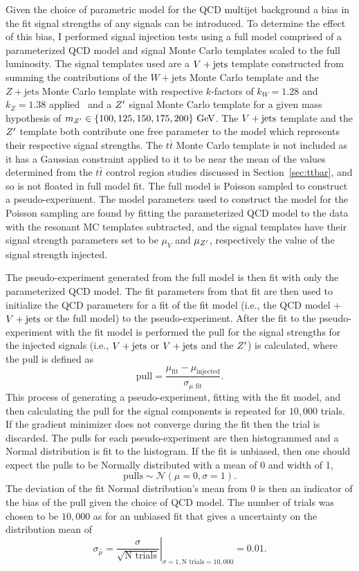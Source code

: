 Given the choice of parametric model for the QCD multijet background a bias in the fit signal strengths of any signals can be introduced.
To determine the effect of this bias, I performed signal injection tests using a full model comprised of a parameterized QCD model and signal Monte Carlo templates scaled to the full luminosity.
The signal templates used are a $V + \text{jets}$ template constructed from summing the contributions of the $W+\mathrm{jets}$ Monte Carlo template and the $Z+\mathrm{jets}$ Monte Carlo template with respective $k$-factors of $k_{W} = 1.28$ and $k_{Z} = 1.38$ applied~\cite{EXOT-2017-01} and a $Z'$ signal Monte Carlo template for a given mass hypothesis of $m_{Z'}\in\{100, 125, 150, 175, 200\}~\mathrm{GeV}$.
The $V + \text{jets}$ template and the $Z'$ template both contribute one free parameter to the model which represents their respective signal strengths.
The $t\bar{t}$ Monte Carlo template is not included as it has a Gaussian constraint applied to it to be near the mean of the values determined from the $t\bar{t}$ control region studies discussed in Section~\ref{sec:ttbar}, and so is not floated in full model fit.
The full model is Poisson sampled to construct a pseudo-experiment.
The model parameters used to construct the model for the Poisson sampling are found by fitting the parameterized QCD model to the data with the resonant MC templates subtracted, and the signal templates have their signal strength parameters set to be $\mu_{V}$ and $\mu_{Z'}$, respectively the value of the signal strength injected.

The pseudo-experiment generated from the full model is then fit with only the parameterized QCD model.
The fit parameters from that fit are then used to initialize the QCD parameters for a fit of the fit model (i.e., the QCD model + $V + \text{jets}$ or the full model) to the pseudo-experiment.
After the fit to the pseudo-experiment with the fit model is performed the pull for the signal strengths for the injected signals (i.e., $V + \text{jets}$ or $V + \text{jets}$ and the $Z'$) is calculated, where the pull is defined as
\begin{equation}
 \mathrm{pull} = \frac{\mu_{\mathrm{fit}} - \mu_{\mathrm{injected}}}{\sigma_{\mu\textrm{ fit}}}.
 \label{eq:pull}
\end{equation}
This process of generating a pseudo-experiment, fitting with the fit model, and then calculating the pull for the signal components is repeated for $10,000$ trials.
If the gradient minimizer does not converge during the fit then the trial is discarded.
The pulls for each pseudo-experiment are then histogrammed and a Normal distribution is fit to the histogram.
If the fit is unbiased, then one should expect the pulls to be Normally distributed with a mean of 0 and width of 1,
\[
 \textrm{pulls} \sim \mathcal{N}\left(\mu=0, \sigma=1\right).
\]
The deviation of the fit Normal distribution's mean from $0$ is then an indicator of the bias of the pull given the choice of QCD model.
The number of trials was chosen to be $10,000$ as for an unbiased fit that gives a uncertainty on the distribution mean of
\[
 \left.\sigma_{\hat{\mu}} = \frac{\sigma}{\sqrt{\textrm{N trials}}}\right|_{\sigma = 1, \textrm{N trials}=10,000} = 0.01.
\]


